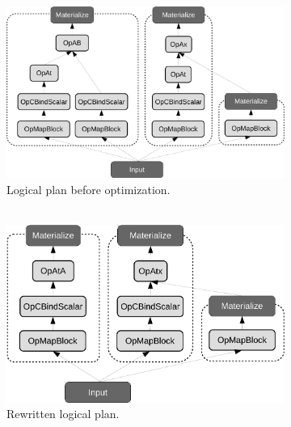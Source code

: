 \documentclass{article}
\begin{document}
\begin{figure}
    \centering
         \begin{subfigure}[b]{0.37\textwidth}
            \centering
            \includegraphics[scale=.25]{figures/linear-regression-logicalplan-crop}
            \caption{Logical plan before optimization.\\$\,$}
            \label{fig:logicalplan}
        \end{subfigure}
  \hfill
         \begin{subfigure}[b]{0.28\textwidth}
            \centering
            \includegraphics[scale=.25]{figures/linear-regression-logicalplan-optimized-crop}
            \caption{Rewritten logical plan.\\$\,$}
            \label{fig:logicalplan-optimized}
        \end{subfigure}
  \hfill
         \begin{subfigure}[b]{0.25\textwidth}
            \centering

\end{subfigure}
\end{figure}
\end{document}
